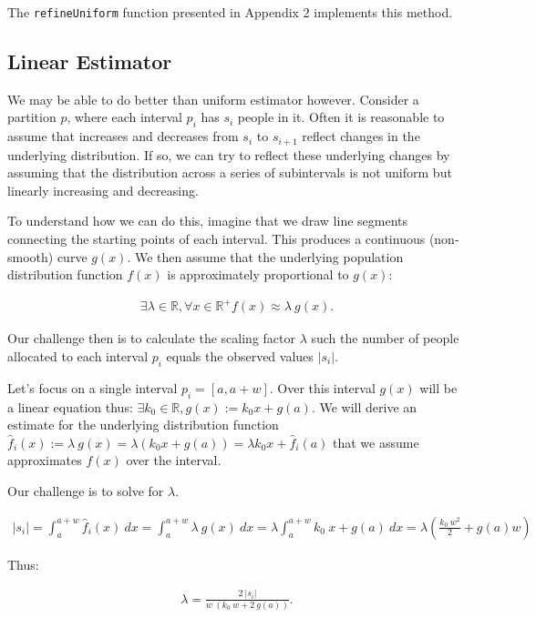 \documentclass[]{article}
\begin{document}
The \texttt{refineUniform} function presented in Appendix 2 implements
this method.

\hypertarget{linear-estimator}{%
\subsection{Linear Estimator}\label{linear-estimator}}

We may be able to do better than uniform estimator however. Consider a
partition \(p\), where each interval \(p_i\) has \(s_i\) people in it.
Often it is reasonable to assume that increases and decreases from
\(s_i\) to \(s_{i+1}\) reflect changes in the underlying distribution.
If so, we can try to reflect these underlying changes by assuming that
the distribution across a series of subintervals is not uniform but
linearly increasing and decreasing.

To understand how we can do this, imagine that we draw line segments
connecting the starting points of each interval. This produces a
continuous (non-smooth) curve \(g (x)\). We then assume that the
underlying population distribution function \(f (x)\) is approximately
proportional to \(g (x)\):

\begin{align*}
\exists \lambda \in \mathbb{R}, \forall x \in \mathbb{R}^+ f (x) \approx \lambda\ g(x).
\end{align*}

Our challenge then is to calculate the scaling factor \(\lambda\) such
the number of people allocated to each interval \(p_i\) equals the
observed values \(|s_i|\).

Let's focus on a single interval \(p_i = [a, a+w]\). Over this interval
\(g (x)\) will be a linear equation thus:
\(\exists k_0 \in \mathbb{R}, g (x) := k_0 x + g (a)\). We will derive
an estimate for the underlying distribution function
\(\hat{f}_i (x) := \lambda\ g (x) = \lambda (k_0 x + g (a)) = \lambda k_0 x + \hat{f}_i (a)\)
that we assume approximates \(f (x)\) over the interval.

Our challenge is to solve for \(\lambda\).

\begin{align*}
|s_i| = \int_a^{a+w} \hat{f}_i(x)\ dx = \int_a^{a+w} \lambda\ g(x)\ dx = \lambda \int_a^{a+w}k_0\ x + g (a)\ dx = \lambda (\frac{k_0\ w^2}{2} + g(a) w) 
\end{align*}

Thus:

\begin{align*}
\lambda = \frac{2\ |s_i|}{w\ (k_0\ w + 2\ g (a))}.
\end{align*}
\end{document}
